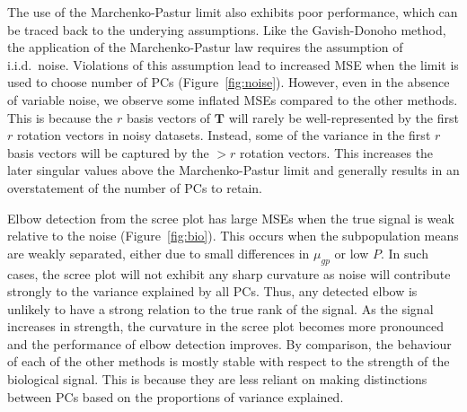 \documentclass[10pt,letterpaper]{article}
\begin{document}
The use of the Marchenko-Pastur limit also exhibits poor performance, which can be traced back to the underying assumptions.
Like the Gavish-Donoho method, the application of the Marchenko-Pastur law requires the assumption of i.i.d.\ noise.
Violations of this assumption lead to increased MSE when the limit is used to choose number of PCs (Figure~\ref{fig:noise}).
However, even in the absence of variable noise, we observe some inflated MSEs compared to the other methods.
This is because the $r$ basis vectors of $\mathbf{T}$ will rarely be well-represented by the first $r$ rotation vectors in noisy datasets.
Instead, some of the variance in the first $r$ basis vectors will be captured by the $>r$ rotation vectors.
This increases the later singular values above the Marchenko-Pastur limit and generally results in an overstatement of the number of PCs to retain. 

Elbow detection from the scree plot has large MSEs when the true signal is weak relative to the noise (Figure~\ref{fig:bio}).
This occurs when the subpopulation means are weakly separated, either due to small differences in $\mu_{gp}$ or low $P$.
In such cases, the scree plot will not exhibit any sharp curvature as noise will contribute strongly to the variance explained by all PCs.
Thus, any detected elbow is unlikely to have a strong relation to the true rank of the signal.
As the signal increases in strength, the curvature in the scree plot becomes more pronounced and the performance of elbow detection improves.
By comparison, the behaviour of each of the other methods is mostly stable with respect to the strength of the biological signal.
This is because they are less reliant on making distinctions between PCs based on the proportions of variance explained.
\end{document}
